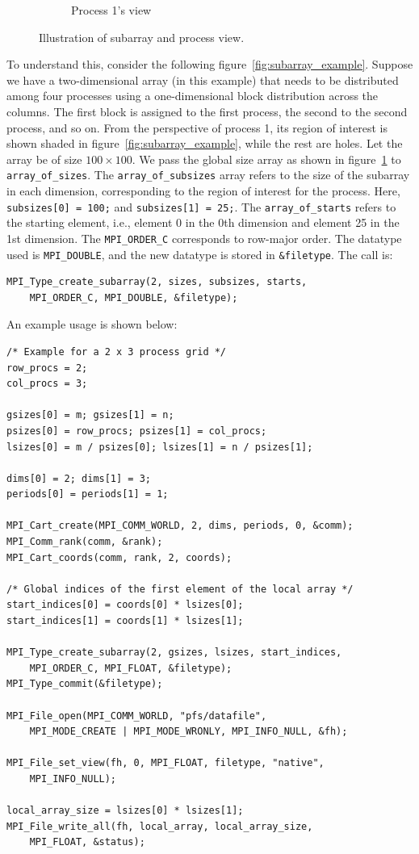 \documentclass[12pt]{book}
\begin{document}
\begin{figure}[H]
\begin{subfigure}[b]{0.4\linewidth}
        \caption{Process 1's view}
        \label{fig:process1view}
    \end{subfigure}
    \caption{Illustration of subarray and process view.}
    \label{fig:combined_subarray}
\end{figure}

To understand this, consider the following figure~\ref{fig:subarray_example}. Suppose we have a two-dimensional array (in this example) that needs to be distributed among four processes using a one-dimensional block distribution across the columns. The first block is assigned to the first process, the second to the second process, and so on. From the perspective of process 1, its region of interest is shown shaded in figure~\ref{fig:subarray_example}, while the rest are holes. 
Let the array be of size $100 \times 100$. We pass the global size array as shown in figure~\ref{fig:process1view} to \texttt{array\_of\_sizes}. The \texttt{array\_of\_subsizes} array refers to the size of the subarray in each dimension, corresponding to the region of interest for the process. Here, \texttt{subsizes[0] = 100;} and \texttt{subsizes[1] = 25;}. The \texttt{array\_of\_starts} refers to the starting element, i.e., element 0 in the 0th dimension and element 25 in the 1st dimension. The \texttt{MPI\_ORDER\_C} corresponds to row-major order. The datatype used is \texttt{MPI\_DOUBLE}, and the new datatype is stored in \texttt{\&filetype}. The call is:
\begin{lstlisting}[style=cppstyle]
MPI_Type_create_subarray(2, sizes, subsizes, starts,
    MPI_ORDER_C, MPI_DOUBLE, &filetype);
\end{lstlisting}

An example usage is shown below:
\begin{lstlisting}[style=cppstyle]
/* Example for a 2 x 3 process grid */
row_procs = 2;
col_procs = 3;

gsizes[0] = m; gsizes[1] = n;
psizes[0] = row_procs; psizes[1] = col_procs;
lsizes[0] = m / psizes[0]; lsizes[1] = n / psizes[1];

dims[0] = 2; dims[1] = 3;
periods[0] = periods[1] = 1;

MPI_Cart_create(MPI_COMM_WORLD, 2, dims, periods, 0, &comm);
MPI_Comm_rank(comm, &rank);
MPI_Cart_coords(comm, rank, 2, coords);

/* Global indices of the first element of the local array */
start_indices[0] = coords[0] * lsizes[0];
start_indices[1] = coords[1] * lsizes[1];

MPI_Type_create_subarray(2, gsizes, lsizes, start_indices,
    MPI_ORDER_C, MPI_FLOAT, &filetype);
MPI_Type_commit(&filetype);

MPI_File_open(MPI_COMM_WORLD, "pfs/datafile",
    MPI_MODE_CREATE | MPI_MODE_WRONLY, MPI_INFO_NULL, &fh);

MPI_File_set_view(fh, 0, MPI_FLOAT, filetype, "native",
    MPI_INFO_NULL);

local_array_size = lsizes[0] * lsizes[1];
MPI_File_write_all(fh, local_array, local_array_size,
    MPI_FLOAT, &status);
\end{lstlisting}
\end{document}
